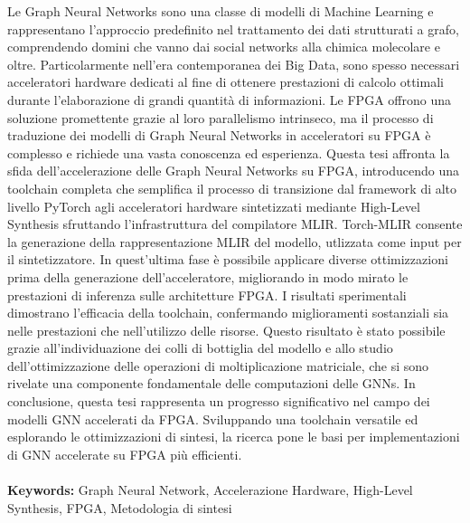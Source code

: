 Le Graph Neural Networks sono una classe di modelli di Machine Learning e rappresentano l'approccio predefinito nel trattamento dei dati strutturati a grafo, comprendendo domini che vanno dai social networks alla chimica molecolare e oltre.
Particolarmente nell'era contemporanea dei Big Data, sono spesso necessari acceleratori hardware dedicati al fine di ottenere prestazioni di calcolo ottimali durante l'elaborazione di grandi quantità di informazioni.
Le FPGA offrono una soluzione promettente grazie al loro parallelismo intrinseco, ma il processo di traduzione dei modelli di Graph Neural Networks in acceleratori su FPGA è complesso e richiede una vasta conoscenza ed esperienza.
Questa tesi affronta la sfida dell'accelerazione delle Graph Neural Networks su FPGA, introducendo una toolchain completa che semplifica il processo di transizione dal framework di alto livello PyTorch agli acceleratori hardware sintetizzati mediante High-Level Synthesis sfruttando l'infrastruttura del compilatore MLIR\@.
Torch-MLIR consente la generazione della rappresentazione MLIR del modello, utlizzata come input per il sintetizzatore.
In quest'ultima fase è possibile applicare diverse ottimizzazioni prima della generazione dell'acceleratore, migliorando in modo mirato le prestazioni di inferenza sulle architetture FPGA\@.
I risultati sperimentali dimostrano l'efficacia della toolchain, confermando miglioramenti sostanziali sia nelle prestazioni che nell'utilizzo delle risorse.
Questo risultato è stato possibile grazie all'individuazione dei colli di bottiglia del modello e allo studio dell'ottimizzazione delle operazioni di moltiplicazione matriciale, che si sono rivelate una componente fondamentale delle computazioni delle GNNs.
In conclusione, questa tesi rappresenta un progresso significativo nel campo dei modelli GNN accelerati da FPGA\@.
Sviluppando una toolchain versatile ed esplorando le ottimizzazioni di sintesi, la ricerca pone le basi per implementazioni di GNN accelerate su FPGA più efficienti.
\\
\\
\textbf{Keywords:} Graph Neural Network, Accelerazione Hardware, High-Level Synthesis, FPGA, Metodologia di sintesi %